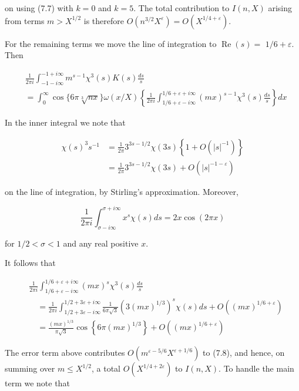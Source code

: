 \documentclass[10pt]{article}
\begin{document}
on using (7.7) with $k=0$ and $k=5$. The total contribution to $I(n, X)$ arising from terms $m>X^{1 / 2}$ is therefore $O\left(n^{3 / 2} X^{\varepsilon}\right)=O\left(X^{1 / 4+\varepsilon}\right)$.

For the remaining terms we move the line of integration to $\operatorname{Re}(s)=$ $1 / 6+\varepsilon$. Then


\begin{align*}
& \frac{1}{2 \pi i} \int_{-1-i \infty}^{-1+i \infty} m^{s-1} \chi^{3}(s) K(s) \frac{d s}{s}  \tag{7.8}\\
& =\int_{0}^{\infty} \cos \{6 \pi \sqrt[3]{n x}\} \omega(x / X)\left\{\frac{1}{2 \pi i} \int_{1 / 6+\varepsilon-i \infty}^{1 / 6+\varepsilon+i \infty}(m x)^{s-1} \chi^{3}(s) \frac{d s}{s}\right\} d x
\end{align*}


In the inner integral we note that

$$
\begin{aligned}
\chi(s)^{3} s^{-1} & =\frac{1}{2 \pi} 3^{3 s-1 / 2} \chi(3 s)\left\{1+O\left(|s|^{-1}\right)\right\} \\
& =\frac{1}{2 \pi} 3^{3 s-1 / 2} \chi(3 s)+O\left(|s|^{-1-\varepsilon}\right)
\end{aligned}
$$

on the line of integration, by Stirling's approximation. Moreover,

$$
\frac{1}{2 \pi i} \int_{\sigma-i \infty}^{\sigma+i \infty} x^{s} \chi(s) d s=2 x \cos (2 \pi x)
$$

for $1 / 2<\sigma<1$ and any real positive $x$.

It follows that

$$
\begin{aligned}
& \frac{1}{2 \pi i} \int_{1 / 6+\varepsilon-i \infty}^{1 / 6+\varepsilon+i \infty}(m x)^{s} \chi^{3}(s) \frac{d s}{s} \\
& \quad=\frac{1}{2 \pi i} \int_{1 / 2+3 \varepsilon-i \infty}^{1 / 2+3 \varepsilon+i \infty} \frac{1}{6 \pi \sqrt{3}}\left(3(m x)^{1 / 3}\right)^{s} \chi(s) d s+O\left((m x)^{1 / 6+\varepsilon}\right) \\
& \quad=\frac{(m x)^{1 / 3}}{\pi \sqrt{3}} \cos \left\{6 \pi(m x)^{1 / 3}\right\}+O\left((m x)^{1 / 6+\varepsilon}\right)
\end{aligned}
$$

The error term above contributes $O\left(m^{\varepsilon-5 / 6} X^{\varepsilon+1 / 6}\right)$ to (7.8), and hence, on summing over $m \leq X^{1 / 2}$, a total $O\left(X^{1 / 4+2 \varepsilon}\right)$ to $I(n, X)$. To handle the main term we note that
\end{document}
